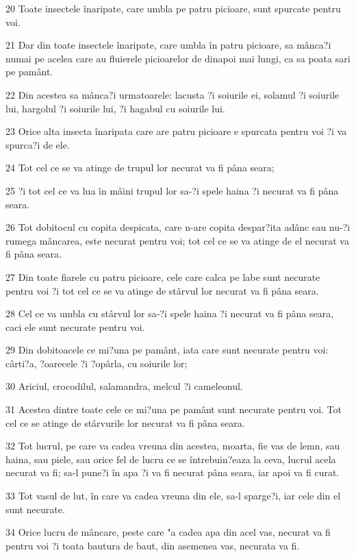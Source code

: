 \par 20 Toate insectele înaripate, care umbla pe patru picioare, sunt spurcate pentru voi.
\par 21 Dar din toate insectele înaripate, care umbla în patru picioare, sa mânca?i numai pe acelea care au fluierele picioarelor de dinapoi mai lungi, ca sa poata sari pe pamânt.
\par 22 Din acestea sa mânca?i urmatoarele: lacusta ?i soiurile ei, solamul ?i soiurile lui, hargolul ?i soiurile lui, ?i hagabul cu soiurile lui.
\par 23 Orice alta insecta înaripata care are patru picioare e spurcata pentru voi ?i va spurca?i de ele.
\par 24 Tot cel ce se va atinge de trupul lor necurat va fi pâna seara;
\par 25 ?i tot cel ce va lua în mâini trupul lor sa-?i spele haina ?i necurat va fi pâna seara.
\par 26 Tot dobitocul cu copita despicata, care n-are copita despar?ita adânc sau nu-?i rumega mâncarea, este necurat pentru voi; tot cel ce se va atinge de el necurat va fi pâna seara.
\par 27 Din toate fiarele cu patru picioare, cele care calca pe labe sunt necurate pentru voi ?i tot cel ce se va atinge de stârvul lor necurat va fi pâna seara.
\par 28 Cel ce va umbla cu stârvul lor sa-?i spele haina ?i necurat va fi pâna seara, caci ele sunt necurate pentru voi.
\par 29 Din dobitoacele ce mi?una pe pamânt, iata care sunt necurate pentru voi: cârti?a, ?oarecele ?i ?opârla, cu soiurile lor;
\par 30 Ariciul, crocodilul, salamandra, melcul ?i cameleonul.
\par 31 Acestea dintre toate cele ce mi?una pe pamânt sunt necurate pentru voi. Tot cel ce se atinge de stârvurile lor necurat va fi pâna seara.
\par 32 Tot lucrul, pe care va cadea vreuna din acestea, moarta, fie vas de lemn, sau haina, sau piele, sau orice fel de lucru ce se întrebuin?eaza la ceva, lucrul acela necurat va fi; sa-l pune?i în apa ?i va fi necurat pâna seara, iar apoi va fi curat.
\par 33 Tot vasul de lut, în care va cadea vreuna din ele, sa-l sparge?i, iar cele din el sunt necurate.
\par 34 Orice lucru de mâncare, peste care "a cadea apa din acel vas, necurat va fi pentru voi ?i toata bautura de baut, din asemenea vas, necurata va fi.
